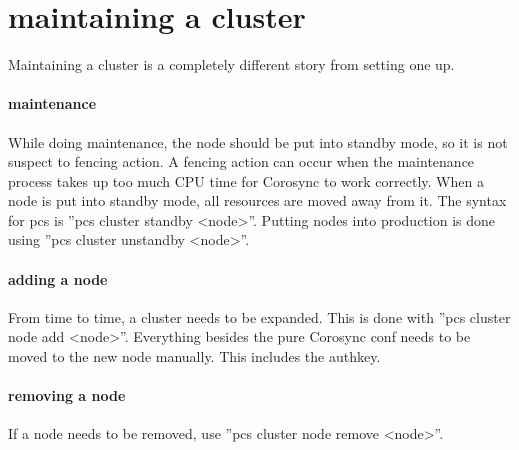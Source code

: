 


\section{maintaining a cluster}
Maintaining a cluster is a completely different story from setting one up.
\paragraph{maintenance}
While doing maintenance, the node should be put into standby mode, so it is not suspect
to fencing action. A fencing action can occur when the maintenance process
takes up too much CPU time for Corosync to work correctly.
When a node is put into standby mode, all resources are moved away from it.
The syntax for pcs is ''pcs cluster standby <node>''. Putting nodes
into production is done using ''pcs cluster unstandby <node>''.
\paragraph{adding a node}
From time to time, a cluster needs to be expanded.
This is done with ''pcs cluster node add <node>''.
Everything besides the pure Corosync conf needs to be moved to the new
node manually. This includes the authkey.
\paragraph{removing a node}
If a node needs to be removed, use ''pcs cluster node remove <node>''.

